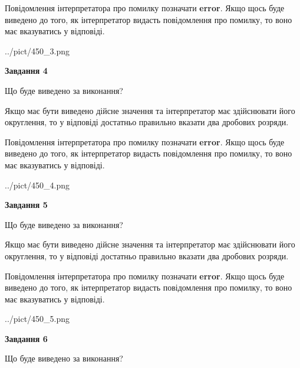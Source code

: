 \documentclass[12pt, ukrainian]{article}
\begin{document}
{\begin {Large}
Повідомлення інтерпретатора про помилку позначати \textbf{error}.
Якщо щось буде виведено до того, як інтерпретатор видасть повідомлення про помилку, 
то воно має вказуватись у відповіді. \par

\begin{center}
	{../pict/450_3.png}
\end{center}
\newpage

{\begin {center}\textbf{Завдання 4}\end {center}}\par
Що буде виведено за виконання? \par

Якщо має бути виведено дійсне значення та інтерпретатор має здійснювати його округлення, 
то у відповіді достатньо правильно вказати два дробових розряди.

Повідомлення інтерпретатора про помилку позначати \textbf{error}.
Якщо щось буде виведено до того, як інтерпретатор видасть повідомлення про помилку, 
то воно має вказуватись у відповіді. \par

\begin{center}
	{../pict/450_4.png}
\end{center}
\newpage

{\begin {center}\textbf{Завдання 5}\end {center}}\par
Що буде виведено за виконання? \par

Якщо має бути виведено дійсне значення та інтерпретатор має здійснювати його округлення, 
то у відповіді достатньо правильно вказати два дробових розряди.

Повідомлення інтерпретатора про помилку позначати \textbf{error}.
Якщо щось буде виведено до того, як інтерпретатор видасть повідомлення про помилку, 
то воно має вказуватись у відповіді. \par

\begin{center}
	{../pict/450_5.png}
\end{center}
\newpage

{\begin {center}\textbf{Завдання 6}\end {center}}\par
Що буде виведено за виконання? \par


\end{Large}}
\end{document}
